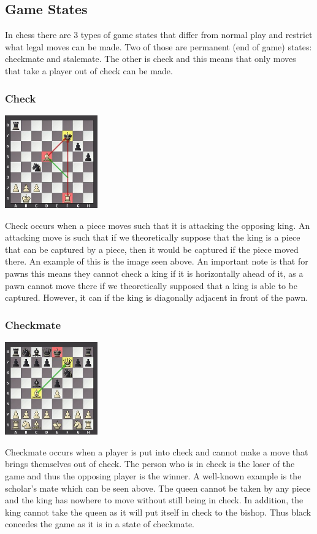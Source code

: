 \documentclass[]{report}
\begin{document}
\subsection{Game States}
In chess there are 3 types of game states that differ from normal play and restrict what legal moves can be made. Two of those are permanent (end of game) states: checkmate and stalemate. The other is check and this means that only moves that take a player out of check can be made. 
\subsubsection{Check}
\begin{center}
	\includegraphics[width=0.3\textwidth]{images/boards/check_example}
\end{center}
Check occurs when a piece moves such that it is attacking the opposing king. An attacking move is such that if we theoretically suppose that the king is a piece that can be captured by a piece, then it would be captured if the piece moved there. An example of this is the image seen above. An important note is that for pawns this means they cannot check a king if it is horizontally ahead of it, as a pawn cannot move there if we theoretically supposed that a king is able to be captured. However, it can if the king is diagonally adjacent in front of the pawn. 
\subsubsection{Checkmate}
\begin{center}
	\includegraphics[width=0.3\textwidth]{images/boards/checkmate_example}
\end{center}
Checkmate occurs when a player is put into check and cannot make a move that brings themselves out of check. The person who is in check is the loser of the game and thus the opposing player is the winner. A well-known example is the scholar's mate which can be seen above. The queen cannot be taken by any piece and the king has nowhere to move without still being in check. In addition, the king cannot take the queen as it will put itself in check to the bishop. Thus black concedes the game as it is in a state of checkmate.
\end{document}
